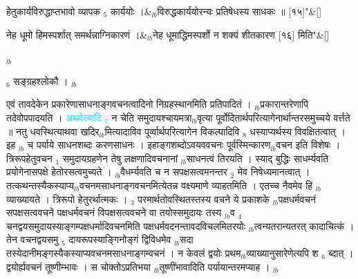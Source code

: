 \documentclass[article,12pt,a4paper]{memoir}%
\newcommand{\quotelemma}[1]{\textcolor{cyan}{#1}}
\newcounter{parCount}
\begin{document}
	    
	    \stanza[\smallbreak]
	  हेतुकार्यविरुद्धाप्तभावो व्यापक {\tiny $_{5}$} कार्ययोः ।&{\tiny $_{lb}$}विरुद्धकार्ययोरन्यः प्रतिषेधस्य साधकः ॥ [१५]{\normalfontlatin\large\qquad{}"}\&[\smallbreak]
	  
	  
	  
	  \endgroup
	
	  \bigskip
	  \begingroup
	
	    
	    \stanza[\smallbreak]
	  नेह धूमो हिमस्पर्शात् समर्थन्नाग्निकारणं ।&{\tiny $_{lb}$}नेह धूमाद्धिमस्पर्शो न शक्यं शीतकारण [१६] मिति{\normalfontlatin\large\qquad{}"}\&[\smallbreak]
	  
	  
	  
	  \endgroup
	{\tiny $_{lb}$}

	  
	  \pstart \leavevmode%
	[—] {\tiny $_{6}$} सङ्ग्रहश्लोकौ ।
	{}
	\pend%
      {\tiny $_{lb}$}

	  
	  \pstart \leavevmode%
	एवं तावदेकेन प्रकारेणासाधनाङ्गवचनत्वादिनो निग्रहस्थानमिति प्रतिपादितं । {\tiny $_{lb}$}प्रकारान्तरेणापि तदेवोपपादयति । \quotelemma{अथवेत्यादि {\tiny $_{7}$}} \cite[6b1]{vn-msN} न चेति समुदायश्चायमत्रा{\tiny $_{lb}$}वृत्या पूर्वोदितार्थपरित्यागेनार्थान्तरसमुच्चये वर्त्तते ॥ नतु धवस्थित्याथवा खदिर{\tiny $_{lb}$}मित्यादाविव पूर्व्वार्थपरित्यागेन विकल्पादिवि {\tiny $_{8}$} \leavevmode{} धस्याप्यर्थस्य विवक्षितत्वात् । इह {\tiny $_{lb}$} \leavevmode{} च पर्याये साधनशब्दः करणसाधनः । इहाङ्गशब्दोऽवयववचनः पूर्वस्मिन्कारण{\tiny $_{lb}$}वचन इति विशेषः । त्रिरूपहेतुवचन {\tiny $_{1}$} समुदायग्रहणेन तेषु लक्षणादिवचनानां {\tiny $_{lb}$}साधनत्वं तिरयति । स्याद् बुद्धिः साधर्म्यवति प्रयोगेनासपक्षे हेतोरसत्वमुच्यते । {\tiny $_{lb}$}वैधर्म्यवति च न सपक्षसत्वमनन्तर {\tiny $_{2}$} मेव निषेध्यमानत्वात् । तत्कथन्तस्यैकस्याप्य{\tiny $_{lb}$}वचनमसाधनाङ्गवचनमित्येतन्न वक्ष्यमाणे व्याहतमिति । एतच्च नैवमेव हि {\tiny $_{lb}$}व्याख्यायते । त्रिरूपो हेतुरर्थात्मकः । {\tiny $_{3}$} परमार्थतोवस्थितस्तस्य वचने ये प्रकाशके {\tiny $_{lb}$}पक्षधर्मवचनं सपक्षसत्ववचने पक्षधर्मवचनं विपक्षसत्ववचने वा तयोस्समुदायः तस्य {\tiny $_{lb}$}व {\tiny $_{4}$} चनद्वयसमुदायस्याङ्गम्पक्षधर्मादिवचनमिति पक्षधर्मवदनन्तावदविचलमितरयोः {\tiny $_{lb}$}त्वन्यतरान्यतरत् कादाचित्कं । तेन वचनद्वयसमु {\tiny $_{5}$} दायरूपस्याङ्गिनोङ्गं द्विविधमेव {\tiny $_{lb}$}सदा तस्येदानीमङ्गस्यैकस्याप्यवचनमसाधनाङ्गम्वचनं । न केवलं द्वयोः प्रथम{\tiny $_{lb}$}व्याख्यानुसारेणेत्यपि श {\tiny $_{6}$} ब्दात् । द्वयोर्ह्यवचनं तूष्णीम्भावः । स चोक्तोऽप्रतिभया {\tiny $_{lb}$}तूष्णींभावादिति पर्यायान्तरमप्याह ।
	{}
	\pend%
      {\tiny $_{lb}$}
\end{document}
